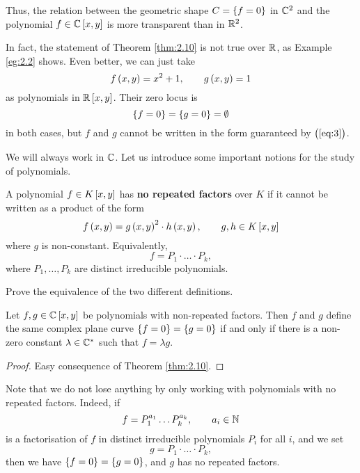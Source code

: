 Thus, the relation between the geometric shape $ C = \cbr{f = 0} $ in $ \mathbb{C}^2 $ and the polynomial $ f \in \CC\sbr{x, y} $ is more transparent than in $ \mathbb{R}^2 $.

\begin{remark}
In fact, the statement of Theorem \ref{thm:2.10} is not true over $ \mathbb{R} $, as Example \ref{eg:2.2} shows. Even better, we can just take
$$ f\br{x, y} = x^2 + 1, \qquad g\br{x, y} = 1 $$
as polynomials in $ \RR\sbr{x, y} $. Their zero locus is
$$ \cbr{f = 0} = \cbr{g = 0} = \emptyset $$
in both cases, but $ f $ and $ g $ cannot be written in the form guaranteed by $ \br{\ref{eq:3}} $.
\end{remark}

We will always work in $ \mathbb{C} $. Let us introduce some important notions for the study of polynomials.

\begin{definition}
A polynomial $ f \in K\sbr{x, y} $ has \textbf{no repeated factors} over $ K $ if it cannot be written as a product of the form
$$ f\br{x, y} = g\br{x, y}^2 \cdot h\br{x, y}, \qquad g, h \in K\sbr{x, y} $$
where $ g $ is non-constant. Equivalently,
$$ f = P_1 \cdot \dots \cdot P_k, $$
where $ P_1, \dots, P_k $ are distinct irreducible polynomials.
\end{definition}

\begin{exercise**}
Prove the equivalence of the two different definitions.
\end{exercise**}

\begin{corollary}
Let $ f, g \in \CC\sbr{x, y} $ be polynomials with non-repeated factors. Then $ f $ and $ g $ define the same complex plane curve $ \cbr{f = 0} = \cbr{g = 0} $ if and only if there is a non-zero constant $ \lambda \in \mathbb{C}^* $ such that $ f = \lambda g $.
\end{corollary}

\begin{proof}
Easy consequence of Theorem \ref{thm:2.10}.
\end{proof}

\begin{remark}
Note that we do not lose anything by only working with polynomials with no repeated factors. Indeed, if
$$ f = P_1^{a_1} \dots P_k^{a_k}, \qquad a_i \in \mathbb{N} $$
is a factorisation of $ f $ in distinct irreducible polynomials $ P_i $ for all $ i $, and we set
$$ g = P_1 \cdot \dots \cdot P_k, $$
then we have $ \cbr{f = 0} = \cbr{g = 0} $, and $ g $ has no repeated factors.
\end{remark}

